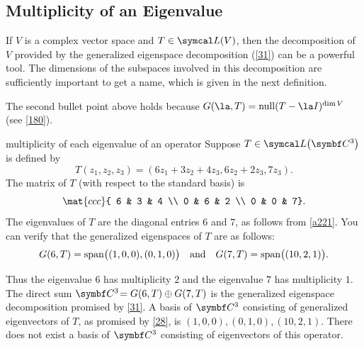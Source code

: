 \subsection{Multiplicity of an Eigenvalue}

If $V$ is a complex vector space and $T\in \L(V)$, then the decomposition of $V$ provided by the generalized eigenspace decomposition (\ref{31}) can be a powerful tool. The dimensions of the subspaces involved in this decomposition are sufficiently important to get a name, which is given in the next definition.


The second bullet point above holds because $G(\la, T) = \ker (T - \la I)^{\dim V}$ (see \ref{180}).

\begin{example}[multex]{multiplicity of each eigenvalue of an operator}
Suppose $T \in \L\paren[\big]{\C{3}}$ is defined by
\[
T(z_1, z_2, z_3) = (6z_1 + 3z_2 + 4z_3, 6z_2 + 2z_3, 7z_3).
\]
The matrix of $T$ (with respect to the standard basis) is
\[
\mat{ccc}{ 6 & 3 & 4 \\
0 & 6 & 2 \\
0 & 0 & 7}.
\]
The eigenvalues of $T$ are the diagonal entries $6$ and $7$, as follows from \ref{a221}. You can verify that the generalized eigenspaces of $T$ are as follows:
\[
G(6, T)  =
\operatorname{span}\bigl( (1, 0, 0), (0, 1, 0) \bigr) \quad \text{and} \quad
G(7, T) = \operatorname{span}\bigl( (10, 2, 1) \bigr).
\]


\noindent
Thus the eigenvalue $6$ has multiplicity $2$ and the eigenvalue $7$ has multiplicity $1$.
The direct sum $\CC3 = G(6, T) \oplus G(7, T)$ is the generalized eigenspace decomposition promised by \ref{31}. A basis of $\C3$ consisting of generalized eigenvectors of $T$, as promised by \ref{28}, is
$
(1, 0, 0), (0, 1, 0), (10, 2, 1)$. There does not exist a basis of $\C3$ consisting of eigenvectors of this operator.
\end{example}

